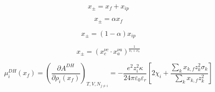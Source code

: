 \documentclass[12pt, letterpaper]{article}
\begin{document}
\begin{equation}
    x_{\pm} = x_{f} + x_{ip}
    \label{eq:x_pm_balance}
\end{equation}


\begin{equation}
    x_{\pm} = \alpha x_{f}
    \label{eq:x_free_ion_from_alpha}
\end{equation}


\begin{equation}
    x_{\pm} = (1 - \alpha) x_{ip}
    \label{eq:x_ion_pair_from_alpha}
\end{equation}


\begin{equation}
    x_{\pm}=(x_{c}^{\nu c}\cdot x_{a}^{\nu a})^{\frac{1}{\nu_{c}+\nu_{a}}}
    \label{eq:x_pm_stoich}
\end{equation}


\begin{equation}
    \mu_{i}^{DH}\left(x_{f}\right)=\left(\frac{\partial A^{DH}}{\partial\rho_{i}\left(x_{f}\right)}\right)_{T,V,N_{j\neq i}}=-\frac{e^{2}z_{i}^{2}\kappa}{24\pi\varepsilon_{0}\varepsilon_{r}}\left[2\chi_{i}+\frac{\sum_{k}x_{k,f}z_{k}^{2}\sigma_{k}}{\sum_{k}x_{k,f}z_{k}^{2}}\right]
    \label{eq:mu_dh_infinite_dilution}
\end{equation}
\end{document}
